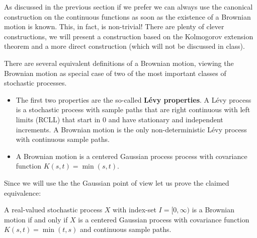 As discussed in the previous section if we prefer we can always use the canonical construction on the continuous functions as soon as the existence of a Brownian motion is known. This, in fact, is non-trivial! There are plenty of clever constructions, we will present a construction based on the Kolmogorov extension theorem and a more direct construction (which will not be discussed in class).\smallskip

There are several equivalent definitions of a Brownian motion, viewing the Brownian motion as special case of two of the most important classes of stochastic processes. 
\begin{itemize}
	\item The first two properties are the so-called \textbf{L\'evy properties}. A L\'evy process is a stochastic process with sample paths that are right continuous with left limits (RCLL) that start in $0$ and have stationary and independent increments. A Brownian motion is the only non-deterministic L\'evy process with continuous sample paths. 
	\item A Brownian motion is a centered Gaussian process process with covariance function $K(s,t)=\min(s,t)$. 
\end{itemize}
Since we will use the the Gaussian point of view let us prove the claimed equivalence:
\begin{llemma}
	\begin{prop}\label{BMGaussian}
		A real-valued stochastic process $X$ with index-set $I=[0,\infty)$ is a Brownian motion if and only if $X$ is a centered Gaussian process with covariance function $K(s,t)=\min(t,s)$ and continuous sample paths.
	\end{prop}
\end{llemma}
